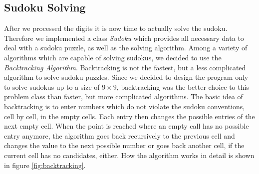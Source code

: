 \documentclass[
a4paper,     %
12pt         %
]{scrartcl}  %
\begin{document}
\subsection{Sudoku Solving}
After we processed the digits it is now time to actually solve the sudoku. Therefore we 
implemented a class \emph{Sudoku} which provides all necessary data to deal with a sudoku puzzle, 
as well as the solving algorithm. Among a variety of algorithms which are capable of solving sudokus,
we decided to use the \emph{Backtracking Algorithm}. Backtracking is not the fastest,
but a less complicated algorithm to solve sudoku puzzles. Since we decided to design the program 
only to solve sudokus up to a size of $9 \times 9$, backtracking was the better choice to this problem class than faster,
but more complicated algorithms. \newline \newline The basic idea of backtracking is to enter numbers which
do not violate the sudoku conventions, cell by cell, in the empty cells. Each entry then changes
the possible entries of the next empty cell. When the point is reached where an empty call has no 
possible entry anymore, the algorithm goes back recursively to the previous cell and changes the value to
the next possible number or goes back another cell, if the current cell has no candidates, either.
How the algorithm works in detail is shown in figure \ref{fig:backtracking}.
\end{document}
